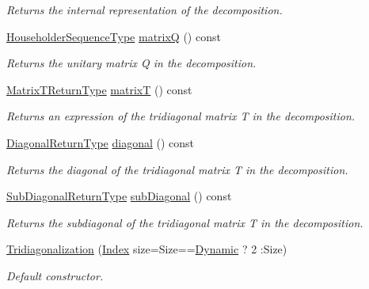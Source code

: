 \begin{DoxyCompactItemize}
\begin{DoxyCompactList}\small\item\em Returns the internal representation of the decomposition. \end{DoxyCompactList}\item 
\hyperlink{group___eigenvalues___module_af322315c8bea9990152c9d09bfa2a69f}{Householder\+Sequence\+Type} \hyperlink{group___eigenvalues___module_a000f7392eda930576ffd2af1fae54af2}{matrixQ} () const
\begin{DoxyCompactList}\small\item\em Returns the unitary matrix Q in the decomposition. \end{DoxyCompactList}\item 
\hyperlink{struct_eigen_1_1internal_1_1_tridiagonalization_matrix_t_return_type}{Matrix\+T\+Return\+Type} \hyperlink{group___eigenvalues___module_a6eb5ef94b8b9bb013c0e69b6df56d0df}{matrixT} () const
\begin{DoxyCompactList}\small\item\em Returns an expression of the tridiagonal matrix T in the decomposition. \end{DoxyCompactList}\item 
\hyperlink{class_eigen_1_1internal_1_1_tensor_lazy_evaluator_writable}{Diagonal\+Return\+Type} \hyperlink{group___eigenvalues___module_a0b7ff4860aa6f7c0761b1059c012fd8e}{diagonal} () const
\begin{DoxyCompactList}\small\item\em Returns the diagonal of the tridiagonal matrix T in the decomposition. \end{DoxyCompactList}\item 
\hyperlink{class_eigen_1_1internal_1_1_tensor_lazy_evaluator_writable}{Sub\+Diagonal\+Return\+Type} \hyperlink{group___eigenvalues___module_ac423dbb91157c159bdcb4b5a8371232e}{sub\+Diagonal} () const
\begin{DoxyCompactList}\small\item\em Returns the subdiagonal of the tridiagonal matrix T in the decomposition. \end{DoxyCompactList}\item 
\hyperlink{group___eigenvalues___module_a9ea2e6154bf35494ee68e037f0867cbd}{Tridiagonalization} (\hyperlink{group___eigenvalues___module_a7bd1f9fccec1e93b77a2214b2d30aae9}{Index} size=Size==\hyperlink{namespace_eigen_ad81fa7195215a0ce30017dfac309f0b2}{Dynamic} ? 2 \+:Size)
\begin{DoxyCompactList}\small\item\em Default constructor. \end{DoxyCompactList}\item 

\end{DoxyCompactItemize}
